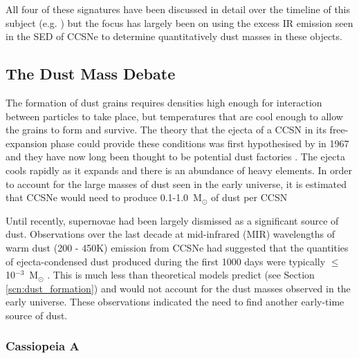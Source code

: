 \noindent All four of these signatures have been discussed in detail over the timeline of this subject (e.g. \citet{Gomez2013}) but the focus has largely been on using the excess IR emission seen in the SED of CCSNe to determine quantitatively dust masses in these objects.  
 

\subsection{The Dust Mass Debate}

The formation of dust grains requires densities high enough for interaction between particles to take place, but temperatures that are cool enough to allow the grains to form and survive.  The theory that the ejecta of a CCSN in its free-expansion phase could provide these conditions  was first hypothesised by \citeauthor{Cernuschi1967} in 1967 and they have now long been thought to be potential dust factories \citep{Hoyle1970, Kozasa1991, Todini2001,Nozawa2003}.  The ejecta cools rapidly as it expands and there is an abundance of heavy elements.  In order to account for the large masses of dust seen in the early universe, it is estimated that CCSNe would need to produce  0.1-1.0~M$_\odot$ of dust per CCSN  \citep{Morgan2003, Dwek2007}

Until recently, supernovae had been largely dismissed as a significant source of dust.  Observations over the last decade at mid-infrared (MIR) wavelengths of warm dust (200 - 450K) emission from CCSNe had suggested that the quantities of ejecta-condensed dust produced during the first 1000 days were typically $\leq$ 10$^{-3}$~M$_\odot$  \citep{Sugerman2006, Meikle2007, Kotak2009, Andrews2010, Fabbri2011}.  This is much less than theoretical models predict (see Section \ref{scn:dust_formation}) and would not account for the dust masses observed in the early universe.  These observations indicated the need to find another early-time source of dust.

\subsubsection{Cassiopeia A}

